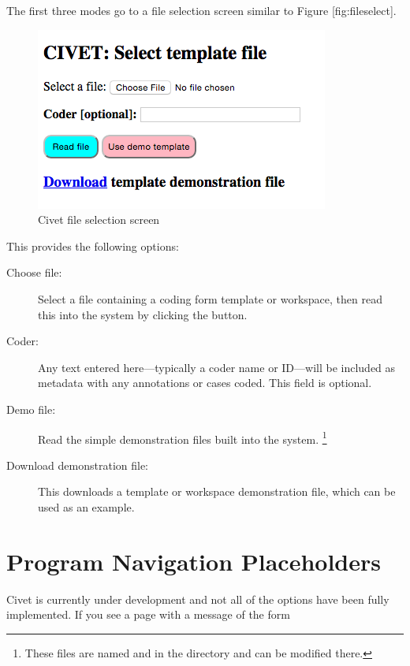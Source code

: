\documentclass[letterpaper,10pt,english]{sphinxmanual}
\begin{document}
The first three modes go to a file selection screen similar to Figure
{[}fig:fileselect{]}.
\begin{figure}[htbp]
\centering
\capstart

\includegraphics{fileselect.png}
\caption{Civet file selection screen}\end{figure}

This provides the following options:
\begin{description}
\item[{Choose file:}] \leavevmode
Select a file containing a coding form template or workspace, then
read this into the system by clicking the  button.

\item[{Coder:}] \leavevmode
Any text entered here—typically a coder name or ID—will be included
as metadata with any annotations or cases coded. This field is
optional.

\item[{Demo file:}] \leavevmode
Read the simple demonstration files built into the system. \footnote{
These files are named  and
 in the directory
 and can be modified
there.
}

\item[{Download demonstration file:}] \leavevmode
This downloads a template or workspace demonstration file, which can
be used as an example.

\end{description}


\section{Program Navigation Placeholders}
\label{homepage:program-navigation-placeholders}
Civet is currently under development and not all of the options have
been fully implemented. If you see a page with a message of the form
\begin{quote}

\end{quote}
\end{document}
